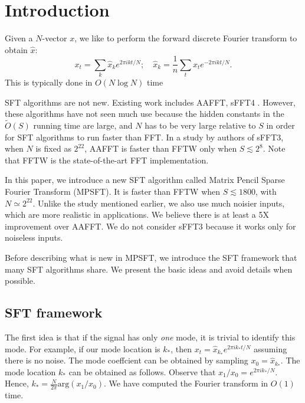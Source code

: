 \documentclass[10pt]{article}
\begin{document}
\pagestyle{plain}
\maketitle

\section{Introduction}
Given a $N$-vector $x$, we like to perform the forward discrete Fourier transform to obtain $\hat{x}$:
$$x_t = \sum_k \hat{x}_k e^{2\pi i kt/N}; \quad \hat{x}_k =\frac{1}{n} \sum_t x_t e^{-2\pi i k t/N}.$$
This is typically done in $O(N \log N)$ time %

SFT algorithms are not new. Existing work includes AAFFT\cite{iwen2007empirical}, sFFT4 \cite{hassanieh2012simple, hassanieh2012nearly}. However, these algorithms have not seen much use because the hidden constants in the $\tilde{O}(S)$ running time are large, and $N$ has to be very large relative to $S$ in order for SFT algorithms to run faster than FFT. In a study by authors of sFFT3, when $N$ is fixed as $2^{22}$, AAFFT is faster than FFTW\cite{FFTW05} only when $S\lesssim 2^8$. Note that FFTW is the state-of-the-art FFT implementation.

In this paper, we introduce a new SFT algorithm called Matrix Pencil Sparse Fourier Transform (MPSFT). It is faster than FFTW when $S \lesssim 1800$, with $N\simeq 2^{22}$. Unlike the study mentioned earlier, we also use much noisier inputs, which are more realistic in applications. We believe there is at least a 5X improvement over AAFFT. We do not consider sFFT3 because it works only for noiseless inputs.

Before describing what is new in MPSFT, we introduce the SFT framework that many SFT algorithms share. We present the basic ideas and avoid details when possible.

\subsection{SFT framework}\label{sec:sftoverview}
The first idea is that if the signal has only \emph{one} mode, it is trivial to identify this mode. For example, if our mode location is $k_*$, then $x_t = \hat{x}_{k_*} e^{2\pi i k_* t/N}$ assuming there is no noise. The mode coeffcient can be obtained by sampling $x_0 = \hat{x}_{k_*}$. The mode location $k_*$ can be obtained as follows. Observe that $x_1/x_0 = e^{2\pi i k_*/N}$. Hence, $k_* = \frac{N}{2\pi} \text{arg}(x_1/x_0)$. We have computed the Fourier transform in $O(1)$ time.
\end{document}
